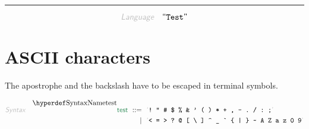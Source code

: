 

\begin{center}
\rule{3in}{0.4pt}
\end{center}

\begin{displaymath}
\KEY{Language} \quad \STRING{Test}
\end{displaymath}

\section{ASCII characters}\hypertarget{ascii-characters}{}\label{ascii-characters}

The apostrophe and the backslash have to be escaped in terminal symbols.

\begin{align*}
  \KEY{Syntax} \quad
     \SYNDECL{test}
      \ ::= \ & \
      \LEX{{!}~{"}~{\HASH}~{\DOLLAR}~{\PERCENT}~{\AMPERSAND}~{\APOSTROPHE}~{(}~{)}~{*}~{+}~{,}~{-}~{.}~{/}~{:}~{;}} \\
      \ \mid \ & \ \LEX{{<}~{=}~{>}~{?}~{@}~{[}~{\BACKSLASH}~{]}~{\CARET}~{\UNDERSCORE}~{\GRAVE}~{\LEFTBRACE}~{|}~{\RIGHTBRACE}~{\TILDE}~A~Z~a~z~0~9}
\end{align*}


